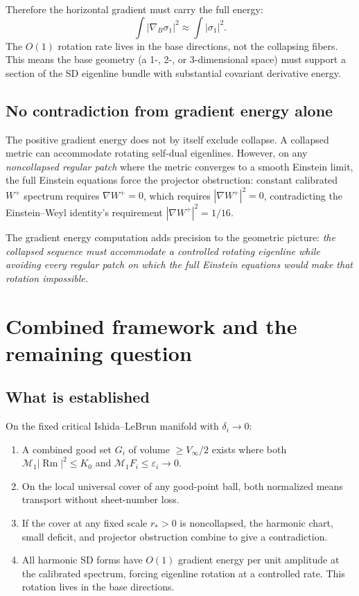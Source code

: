 Therefore the horizontal gradient must carry the full energy:
\[
\int|\nabla_B\sigma_1|^2 \approx \int|\sigma_1|^2.
\]
The $O(1)$ rotation rate lives in the base directions, not the collapsing
fibers. This means the base geometry (a 1-, 2-, or 3-dimensional space)
must support a section of the SD eigenline bundle with substantial
covariant derivative energy.

\subsection{No contradiction from gradient energy alone}
The positive gradient energy does not by itself exclude collapse.
A collapsed metric can accommodate rotating self-dual eigenlines.
However, on any \emph{noncollapsed regular patch} where the metric
converges to a smooth Einstein limit, the full Einstein equations
force the projector obstruction: constant calibrated $W^+$ spectrum
requires $\nabla W^+ = 0$, which requires $|\nabla W^+|^2 = 0$,
contradicting the Einstein--Weyl identity's requirement
$|\nabla W^+|^2 = 1/16$.

The gradient energy computation adds precision to the geometric picture:
\textit{the collapsed sequence must accommodate a controlled rotating
eigenline while avoiding every regular patch on which the full Einstein
equations would make that rotation impossible.}

\section{Combined framework and the remaining question}

\subsection{What is established}
On the fixed critical Ishida--LeBrun manifold with $\delta_i\to0$:
\begin{enumerate}
\item A combined good set $G_i$ of volume $\ge V_\infty/2$ exists
where both $\mathcal{M}_1|\operatorname{Rm}|^2 \le K_0$
and $\mathcal{M}_1 F_i \le \varepsilon_i\to0$.
\item On the local universal cover of any good-point ball,
both normalized means transport without sheet-number loss.
\item If the cover at any fixed scale $r_* > 0$ is noncollapsed,
the harmonic chart, small deficit, and projector obstruction
combine to give a contradiction.
\item All harmonic SD forms have $O(1)$ gradient energy per unit
amplitude at the calibrated spectrum, forcing eigenline rotation
at a controlled rate. This rotation lives in the base directions.
\end{enumerate}

